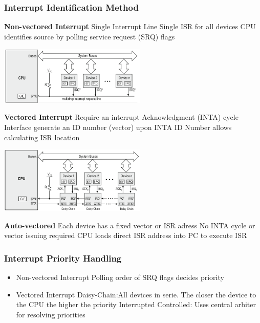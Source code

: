 	\subsubsection{Interrupt Identification Method}
	\begin{itemize}
		\begin{minipage}{11cm}
			\item \textbf{Non-vectored Interrupt}
			\subitem Single Interrupt Line
			\subitem Single ISR for all devices
			\subitem CPU identifies source by polling service request (SRQ) flags
		\end{minipage}	
		\begin{minipage}{8cm}
			\includegraphics[width=7cm]{images/nonvectored.png}
		\end{minipage}
		\begin{minipage}{11cm}
			\item \textbf{Vectored Interrupt}
			\subitem Require an interrupt Acknowledgment (INTA) cycle
			\subitem Interface generate an ID number (vector) upon INTA
			\subitem ID Number allows calculating ISR location
		\end{minipage}
			\begin{minipage}{8cm}
			\includegraphics[width=7cm]{images/vectored.png}
		\end{minipage}
		\item \textbf{Auto-vectored}
		\subitem Each device has a fixed vector or ISR adress
		\subitem No INTA cycle or vector issuing required
		\subitem CPU loads direct ISR address into PC to execute ISR
	\end{itemize}
\subsubsection{Interrupt Priority Handling}
\begin{itemize}
	\item Non-vectored Interrupt
	\subitem Polling order of SRQ flags decides priority
	\item Vectored Interrupt
	\subitem Daisy-Chain:All devices in serie. The closer the device to the CPU the higher the priority
	\subitem Interrupted Controlled: Uses central arbiter for resolving priorities
\end{itemize}
\clearpage
\pagebreak
